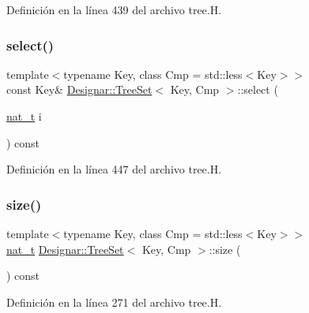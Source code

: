 Definición en la línea 439 del archivo tree.\+H.

\mbox{\label{class_designar_1_1_tree_set_a811d76a361633a8de4a37042fec3b971}} 
\subsubsection{\texorpdfstring{select()}{select()}\hspace{0.1cm}{\footnotesize\ttfamily [2/2]}}
{\footnotesize\ttfamily template$<$typename Key, class Cmp = std\+::less$<$\+Key$>$$>$ \\
const Key\& \hyperlink{class_designar_1_1_tree_set}{Designar\+::\+Tree\+Set}$<$ Key, Cmp $>$\+::select (\begin{DoxyParamCaption}\item[{\hyperlink{namespace_designar_aa72662848b9f4815e7bf31a7cf3e33d1}{nat\+\_\+t}}]{i }\end{DoxyParamCaption}) const\hspace{0.3cm}{\ttfamily [inline]}}



Definición en la línea 447 del archivo tree.\+H.

\mbox{\label{class_designar_1_1_tree_set_acb3cd6e2382851772714603d5fe5c644}} 
\subsubsection{\texorpdfstring{size()}{size()}}
{\footnotesize\ttfamily template$<$typename Key, class Cmp = std\+::less$<$\+Key$>$$>$ \\
\hyperlink{namespace_designar_aa72662848b9f4815e7bf31a7cf3e33d1}{nat\+\_\+t} \hyperlink{class_designar_1_1_tree_set}{Designar\+::\+Tree\+Set}$<$ Key, Cmp $>$\+::size (\begin{DoxyParamCaption}{ }\end{DoxyParamCaption}) const\hspace{0.3cm}{\ttfamily [inline]}}



Definición en la línea 271 del archivo tree.\+H.

